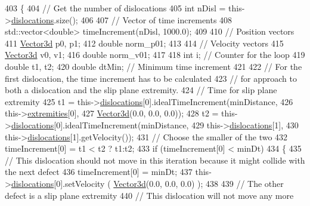 \begin{DoxyCode}
403  \{
404    \textcolor{comment}{// Get the number of dislocations}
405    \textcolor{keywordtype}{int} nDisl = this->\hyperlink{classSlipPlane_ad92c7c409f7e161db449528389180910}{dislocations}.size();
406 
407    \textcolor{comment}{// Vector of time increments}
408    std::vector<double> timeIncrement(nDisl, 1000.0);
409 
410    \textcolor{comment}{// Position vectors}
411    \hyperlink{classVector3d}{Vector3d} p0, p1;
412    \textcolor{keywordtype}{double} norm\_p01;
413 
414    \textcolor{comment}{// Velocity vectors}
415    \hyperlink{classVector3d}{Vector3d} v0, v1;
416    \textcolor{keywordtype}{double} norm\_v01;
417 
418    \textcolor{keywordtype}{int} i;         \textcolor{comment}{// Counter for the loop}
419    \textcolor{keywordtype}{double} t1, t2;
420    \textcolor{keywordtype}{double} dtMin;  \textcolor{comment}{// Minimum time increment}
421 
422    \textcolor{comment}{// For the first dislocation, the time increment has to be calculated}
423    \textcolor{comment}{// for approach to both a dislocation and the slip plane extremity.}
424    \textcolor{comment}{// Time for slip plane extremity}
425    t1 = this->\hyperlink{classSlipPlane_ad92c7c409f7e161db449528389180910}{dislocations}[0].idealTimeIncrement(minDistance,
426                                                  this->\hyperlink{classSlipPlane_abbdbe6ed805faf3777b54ff55a9c089c}{extremities}[0],
427                                                  \hyperlink{classVector3d}{Vector3d}(0.0, 0.0, 0.0));
428    t2 = this->\hyperlink{classSlipPlane_ad92c7c409f7e161db449528389180910}{dislocations}[0].idealTimeIncrement(minDistance,
429                                                  this->\hyperlink{classSlipPlane_ad92c7c409f7e161db449528389180910}{dislocations}[1],
430                                                  this->\hyperlink{classSlipPlane_ad92c7c409f7e161db449528389180910}{dislocations}[1].getVelocity());
431    \textcolor{comment}{// Choose the smaller of the two}
432    timeIncrement[0] = t1 < t2 ? t1:t2;
433    \textcolor{keywordflow}{if} (timeIncrement[0] < minDt)
434      \{
435        \textcolor{comment}{// This dislocation should not move in this iteration because it might collide with the next defect}
436        timeIncrement[0] = minDt;
437        this->\hyperlink{classSlipPlane_ad92c7c409f7e161db449528389180910}{dislocations}[0].setVelocity ( \hyperlink{classVector3d}{Vector3d}(0.0, 0.0, 0.0) );
438 
439        \textcolor{comment}{// The other defect is a slip plane extremity}
440        \textcolor{comment}{// This dislocation will not move any more}

\end{DoxyCode}
